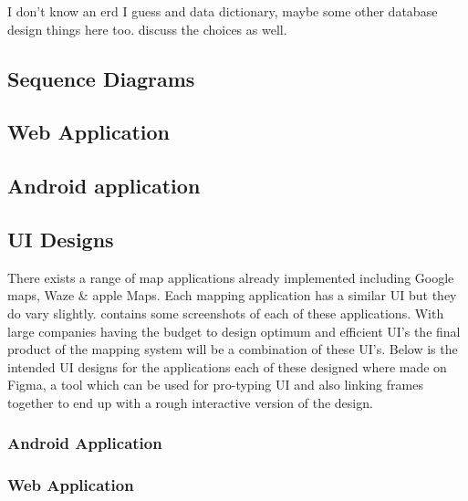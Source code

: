 I don't know an erd I guess and data dictionary, maybe some other database design things here too. discuss the choices as well.

\subsection{Sequence Diagrams}
\subsection{Web Application}

\subsection{Android application}

\subsection{UI Designs}
There exists a range of map applications already implemented including Google maps, Waze \& apple Maps. Each mapping application has a similar UI but they do vary slightly. \appendixtemp contains some screenshots of each of these applications. With large companies having the budget to design optimum and efficient UI's the final product of the mapping system will be a combination of these UI's. Below is the intended UI designs for the applications each of these designed where made on Figma, a tool which can be used for pro-typing UI and also linking frames together to end up with a rough interactive version of the design.

\subsubsection{Android Application}


\subsubsection{Web Application}
